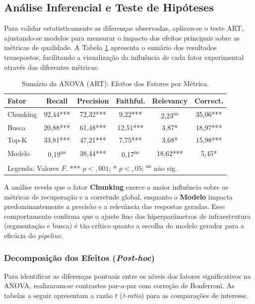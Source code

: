 \subsection{Análise Inferencial e Teste de Hipóteses}

Para validar estatisticamente as diferenças observadas, aplicou-se o teste ART, ajustando-se modelos para mensurar o impacto dos efeitos principais sobre as métricas de qualidade. A Tabela \ref{tab:anova_transposta} apresenta o sumário dos resultados transpostos, facilitando a visualização da influência de cada fator experimental através das diferentes métricas.

\begin{table}[!ht]
  \centering
  \caption{Sumário da ANOVA (ART): Efeitos dos Fatores por Métrica.}
  \label{tab:anova_transposta}
  \small
  \begin{tabular}{lccccc}
    \toprule
    \textbf{Fator} & \textbf{Recall} & \textbf{Precision} & \textbf{Faithful.} & \textbf{Relevancy} & \textbf{Correct.} \\ \midrule
    Chunking & 92,44*** & 72,32*** & 9,22*** & 2,23\textsuperscript{ns} & 35,06*** \\
    Busca    & 20,88*** & 61,48*** & 12,51*** & 3,87* & 18,97*** \\
    Top-K    & 33,81*** & 47,21*** & 7,75*** & 3,68* & 15,98*** \\
    Modelo   & 0,19\textsuperscript{ns} & 38,44*** & 0,17\textsuperscript{ns} & 18,62*** & 5,45* \\ \bottomrule
    \multicolumn{6}{l}{\scriptsize Legenda: Valores $F$. *** $p < ,001$; * $p < ,05$; \textsuperscript{ns} não sig.}
  \end{tabular}
\end{table}

A análise revela que o fator \textbf{Chunking} exerce a maior influência sobre as métricas de recuperação e a corretude global, enquanto o \textbf{Modelo} impacta predominantemente a precisão e a relevância das respostas geradas. Esse comportamento confirma que o ajuste fino dos hiperparâmetros de infraestrutura (segmentação e busca) é tão crítico quanto a escolha do modelo gerador para a eficácia do \textit{pipeline}.

\subsubsection{Decomposição dos Efeitos (\textit{Post-hoc})}

Para identificar as diferenças pontuais entre os níveis dos fatores significativos na ANOVA, realizaram-se contrastes par-a-par com correção de Bonferroni. As tabelas a seguir apresentam a razão $t$ (\textit{t-ratio}) para as comparações de interesse.

